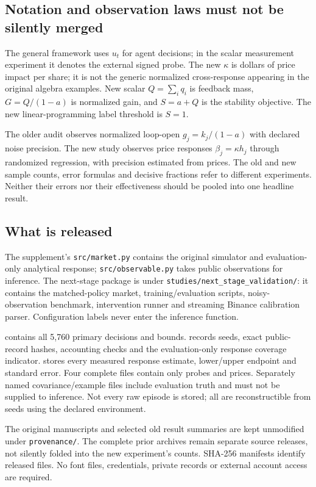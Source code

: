 \documentclass[11pt,a4paper]{article}
\theoremstyle{definition}
\theoremstyle{remark}
\begin{document}
\subsection{Notation and observation laws must not be silently merged}
The general framework uses $u_t$ for agent decisions; in the scalar measurement experiment it denotes the external signed probe. The new $\kappa$ is dollars of price impact per share; it is not the generic normalized cross-response appearing in the original algebra examples. New scalar $Q=\sum_iq_i$ is feedback mass, $G=Q/(1-a)$ is normalized gain, and $S=a+Q$ is the stability objective. The new linear-programming label threshold is $S=1$.

The older audit observes normalized loop-open $g_j=k_j/(1-a)$ with declared noise precision. The new study observes price responses $\beta_j=\kappa h_j$ through randomized regression, with precision estimated from prices. The old and new sample counts, error formulas and decisive fractions refer to different experiments. Neither their errors nor their effectiveness should be pooled into one headline result.

\subsection{What is released}
The supplement's \texttt{src/market.py} contains the original simulator and evaluation-only analytical response; \texttt{src/observable.py} takes public observations for inference. The next-stage package is under \texttt{studies/next\_stage\_validation/}: it contains the matched-policy market, training/evaluation scripts, noisy-observation benchmark, intervention runner and streaming Binance calibration parser. Configuration labels never enter the inference function.

 contains all 5,760 primary decisions and bounds.  records seeds, exact public-record hashes, accounting checks and the evaluation-only response coverage indicator.  stores every measured response estimate, lower/upper endpoint and standard error. Four complete  files contain only probes and prices. Separately named covariance/example files include evaluation truth and must not be supplied to inference. Not every raw episode is stored; all are reconstructible from seeds using the declared environment.

The original manuscripts and selected old result summaries are kept unmodified under \texttt{provenance/}. The complete prior archives remain separate source releases, not silently folded into the new experiment's counts. SHA-256 manifests identify released files. No font files, credentials, private records or external account access are required.
\end{document}
